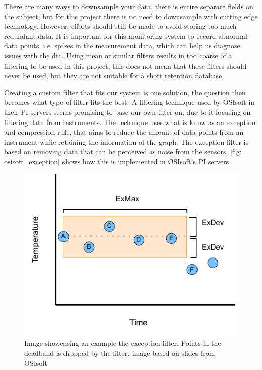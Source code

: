 \documentclass[main.tex]{subfiles}
\begin{document}
 There are many ways to downsample your data, there is entire separate fields on the subject, but for this project there is no need to downsample with cutting edge technology. However, efforts should still be made to avoid storing too much redundant data. It is important for this monitoring system to record abnormal data points, i.e. spikes in the measurement data, which can help us diagnose issues with the \gls{dtc}. Using mean or similar filters results in too coarse of a filtering to be used in this project, this does not mean that these filters should never be used, but they are not suitable for a short retention database.
 
 Creating a custom filter that fits our system is one solution, the question then becomes what type of filter fits the best. A filtering technique used by OSIsoft in their PI servers seems promising to base our own filter on, due to it focusing on filtering data from instruments\cite{osisoft_exception}. The technique uses what is know as an exception and compression rule, that aims to reduce the amount of data points from an instrument while retaining the information of the graph. The exception filter is based on removing data that can be perceived as noise from the sensors. \autoref{fig: osisoft_exception} shows how this is implemented in OSIsoft's PI servers.
 
\begin{figure}[!ht]
    \centering
    \includegraphics[scale=1.3]{images/exception_process.pdf}
    \caption{Image showcasing an example the exception filter. Points in the deadband is dropped by the filter. image based on slides from OSIsoft\cite{osisoft_image}}
    \label{fig: osisoft_exception}
\end{figure}
\FloatBarrier 
 
\end{document}
